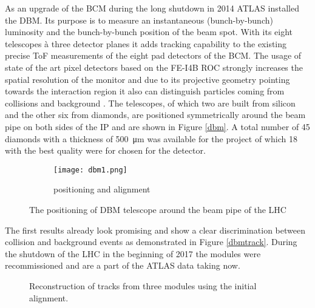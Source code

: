 As an upgrade of the \ac{BCM} during the long shutdown in 2014 ATLAS installed the \ac{DBM}. Its purpose is to measure an instantaneous (bunch-by-bunch) luminosity and the bunch-by-bunch position of the beam spot. With its eight telescopes à three detector planes it adds tracking capability to the existing precise \ac{ToF} measurements of the eight pad detectors of the \ac{BCM}. The usage of state of the art pixel detectors based on the FE-I4B \ac{ROC} \cite{malte} strongly increases the spatial resolution of the monitor and due to its projective geometry pointing towards the interaction region it also can distinguish particles coming from collisions and background \cite{dbm}. The telescopes, of which two are built from silicon and the other six from \pcvd diamonds, are positioned symmetrically around the beam pipe on both sides of the \ac{IP} and are shown in Figure \vref{dbm}. A total number of 45 diamonds with a thickness of \SI{500}{\micro\meter} was available for the project of which 18 with the best quality were for chosen for the detector.

\begin{figure}
	\centering
	\begin{subfigure}{.66\textwidth}
		\centering
		\vspace*{.05\textheight}
		\texttt{[image: dbm1.png]}
		\vspace*{.02\textheight}
		\caption{positioning and alignment}
	\end{subfigure}
	\caption{The positioning of \ac{DBM} telescope around the beam pipe of the \ac{LHC}}
	\label{dbm}
\end{figure}

\noindent
The first results already look promising and show a clear discrimination between collision and background events as demonstrated in Figure \vref{dbmtrack}. During the shutdown of the \ac{LHC} in the beginning of 2017 the modules were recommissioned and are a part of the ATLAS data taking now.

\begin{figure}
	\centering
	\caption{Reconstruction of tracks from three modules using the initial alignment.}
	\label{dbmtrack}
\end{figure}

